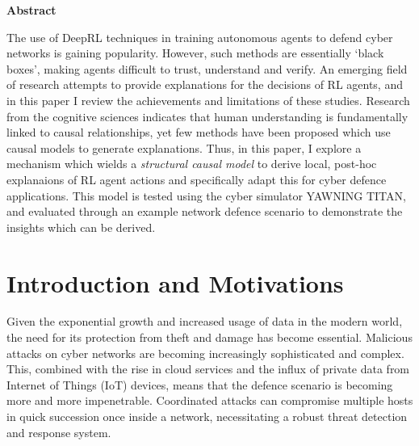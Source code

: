 \documentclass{article}
\begin{document}
\vspace{8cm}
\begin{center}
  \textbf{ \Large Abstract}

    \vspace{0.5cm}

The use of DeepRL techniques in training autonomous agents to defend cyber networks is gaining popularity. However, such methods are essentially `black boxes', making agents difficult to trust, understand and verify. An emerging field of research attempts to provide explanations for the decisions of RL agents, and in this paper I review the achievements and limitations of these studies. Research from the cognitive sciences indicates that human understanding is fundamentally linked to causal relationships, yet few methods have been proposed which use causal models to generate explanations. Thus, in this paper, I explore a mechanism which wields a \textit{structural causal model} \cite{pearl2009causality} to derive local, post-hoc explanaions of RL agent actions and specifically adapt this for cyber defence applications. This model is tested using the cyber simulator YAWNING TITAN, and evaluated through an example network defence scenario to demonstrate the insights which can be derived.


\end{center}




\newpage 

\tableofcontents
\pagebreak

\section{Introduction and Motivations}

Given the exponential growth and increased usage of data in the modern world, the need for its protection from theft and damage has become essential. Malicious attacks on cyber networks are becoming increasingly sophisticated and complex. This, combined with the rise in cloud services and the influx of private data from Internet of Things (IoT) devices, means that the defence scenario is becoming more and more impenetrable. Coordinated attacks can compromise multiple hosts in quick succession once inside a network, necessitating a robust threat detection and response system. 
\end{document}
